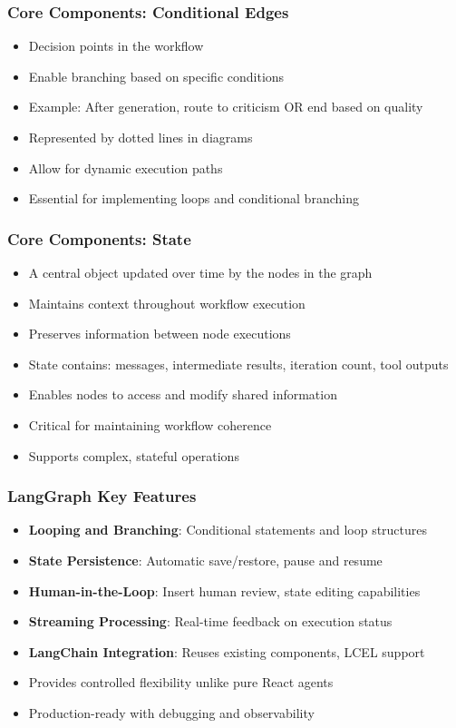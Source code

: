 \begin{frame}[fragile]\frametitle{Core Components: Conditional Edges}
      \begin{itemize}
        \item Decision points in the workflow
        \item Enable branching based on specific conditions
        \item Example: After generation, route to criticism OR end based on quality
        \item Represented by dotted lines in diagrams
        \item Allow for dynamic execution paths
        \item Essential for implementing loops and conditional branching
      \end{itemize}
\end{frame}

\begin{frame}[fragile]\frametitle{Core Components: State}
      \begin{itemize}
	    \item A central object updated over time by the nodes in the graph
        \item Maintains context throughout workflow execution
        \item Preserves information between node executions
        \item State contains: messages, intermediate results, iteration count, tool outputs
        \item Enables nodes to access and modify shared information
        \item Critical for maintaining workflow coherence
        \item Supports complex, stateful operations
      \end{itemize}
\end{frame}


\begin{frame}[fragile]\frametitle{LangGraph Key Features}
      \begin{itemize}
        \item \textbf{Looping and Branching}: Conditional statements and loop structures
        \item \textbf{State Persistence}: Automatic save/restore, pause and resume
        \item \textbf{Human-in-the-Loop}: Insert human review, state editing capabilities
        \item \textbf{Streaming Processing}: Real-time feedback on execution status
        \item \textbf{LangChain Integration}: Reuses existing components, LCEL support
        \item Provides controlled flexibility unlike pure React agents
        \item Production-ready with debugging and observability
      \end{itemize}
\end{frame}


